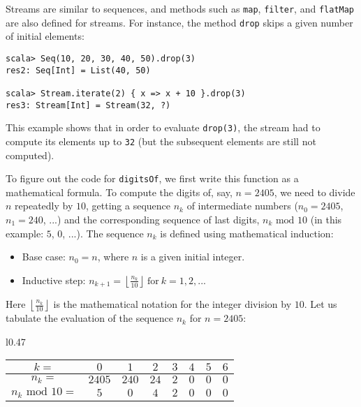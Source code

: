 Streams are similar to sequences, and methods such as \lstinline!map!,
\lstinline!filter!, and \lstinline!flatMap! are also defined for
streams. For instance, the method \lstinline!drop! skips a given
number of initial elements:
\begin{lstlisting}
scala> Seq(10, 20, 30, 40, 50).drop(3)
res2: Seq[Int] = List(40, 50)

scala> Stream.iterate(2) { x => x + 10 }.drop(3)
res3: Stream[Int] = Stream(32, ?)
\end{lstlisting}
This example shows that in order to evaluate \lstinline!drop(3)!,
the stream had to compute its elements up to \lstinline!32! (but
the subsequent elements are still not computed).

To figure out the code for \lstinline!digitsOf!, we first write this
function as a mathematical formula. To compute the digits of, say,
$n=2405$, we need to divide $n$ repeatedly by $10$, getting a sequence
$n_{k}$ of intermediate numbers ($n_{0}=2405$, $n_{1}=240$, ...)
and the corresponding sequence of last digits, $n_{k}\text{ mod }10$
(in this example: $5$, $0$, ...). The sequence $n_{k}$ is defined
using mathematical induction:
\begin{itemize}
\item Base case: $n_{0}=n$, where $n$ is a given initial integer.
\item Inductive step: $n_{k+1}=\left\lfloor \frac{n_{k}}{10}\right\rfloor \ \text{for}\ k=1,2,...$
\end{itemize}
Here $\left\lfloor \frac{n_{k}}{10}\right\rfloor $ is the mathematical
notation for the integer division by $10$. Let us tabulate the evaluation
of the sequence $n_{k}$ for $n=2405$: 

\begin{wraptable}{l}{0.47\columnwidth}%
\begin{centering}
\vspace{-0.85\baselineskip}
\begin{tabular}{|c|c|c|c|c|c|c|c|}
\hline 
{\small{}$k=$} & {\small{}$0$} & {\small{}$1$} & {\small{}$2$} & {\small{}$3$} & {\small{}$4$} & {\small{}$5$} & {\small{}$6$}\tabularnewline
\hline 
{\small{}$n_{k}=$} & {\small{}$2405$} & {\small{}$240$} & {\small{}$24$} & {\small{}$2$} & {\small{}$0$} & {\small{}$0$} & {\small{}$0$}\tabularnewline
\hline 
{\small{}$n_{k}\text{ mod }10=$} & {\small{}$5$} & {\small{}$0$} & {\small{}$4$} & {\small{}$2$} & {\small{}$0$} & {\small{}$0$} & {\small{}$0$}\tabularnewline
\hline 
\end{tabular}
\par\end{centering}
\vspace{-1\baselineskip}
\end{wraptable}%

